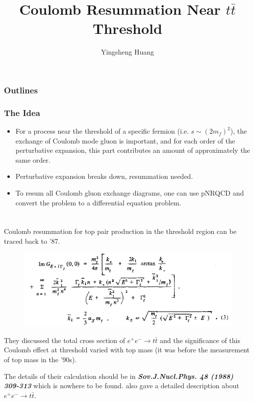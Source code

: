 \documentclass[8pt,dvipsnames,table]{beamer}
\title{Coulomb Resummation Near $t\bar t$ Threshold}
\author[Y. Huang]{Yingsheng Huang}
\institute[IHEP]{Institute of High Energy Physics}
\date
\begin{document}
\begin{frame}{}
	\maketitle
\end{frame}

\begin{frame}
	\frametitle{Outlines}
	\tableofcontents
\end{frame}

\begin{frame}
	\frametitle{The Idea}

	
	\begin{itemize}
		\item For a process near the threshold of a specific fermion (i.e. $s\sim(2m_f)^2$), the exchange of Coulomb mode gluon is important, and for each order of the perturbative expansion, this part contributes an amount of approximately the same order. 
		\item Perturbative expansion breaks down, resummation needed. 
		\item To resum all Coulomb gluon exchange diagrams, one can use pNRQCD and convert the problem to a differential equation problem. 
	\end{itemize}



\end{frame}

\section{\citet{Fadin1987}}
\begin{frame}
	\frametitle{\citet{Fadin1987}}

	Coulomb resummation for top pair production in the threshold region can be traced back to '87\citep{Fadin1987}.
	\begin{figure}[!htb]
		\centering
		\includegraphics[width=\linewidth]{image1.png}
		\label{fig:image1}
	\end{figure}
	They discussed the total cross section of $e^+e^-\to t\bar t$ and the significance of this Coulomb effect at threshold varied with top mass (it was before the measurement of top mass in the '90s).

	\pause
	The details of their calculation should be in \textbf{\textit{Sov.J.Nucl.Phys. 48 (1988) 309-313}} which is nowhere to be found. \textbf{\textit{\citet{Strassler:1990nw}}} also gave a detailed description about $e^+e^-\to t\bar t$. 


\end{frame}
\end{document}
